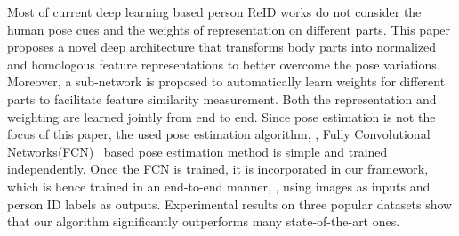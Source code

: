 \documentclass[10pt,twocolumn,letterpaper]{article}
\begin{document}
Most of current deep learning based person ReID works do not consider the human pose cues and the weights of representation on different parts. This paper proposes a novel deep architecture that transforms body parts into normalized and homologous feature representations to better overcome the pose variations. Moreover, a sub-network is proposed to automatically learn weights for different parts to facilitate feature similarity measurement. Both the representation and weighting are learned jointly from end to end. Since pose estimation is not the focus of this paper, the used pose estimation algorithm, \ie, Fully Convolutional Networks(FCN)~\cite{long2015fully} based pose estimation method is simple and trained independently. Once the FCN is trained, it is incorporated in our framework, which is hence trained in an end-to-end manner, \ie, using images as inputs and person ID labels as outputs. Experimental results on three popular datasets show that our algorithm significantly outperforms many state-of-the-art ones.
\end{document}
